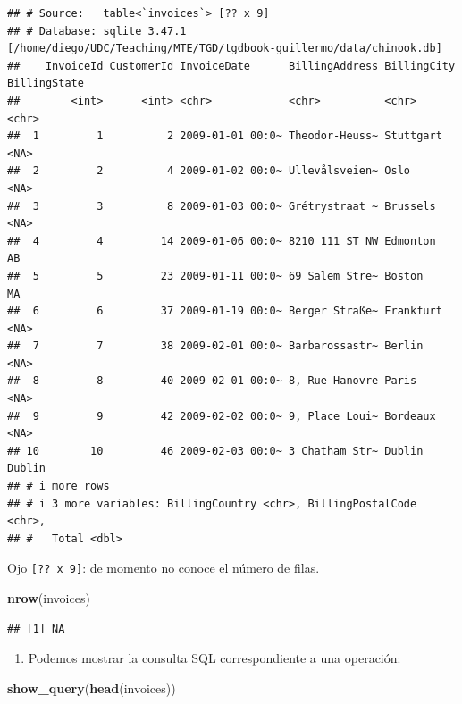 \documentclass[
]{book}
\newenvironment{Shaded}{\begin{snugshade}}{\end{snugshade}}
\newcommand{\FunctionTok}[1]{\textcolor[rgb]{0.13,0.29,0.53}{\textbf{#1}}}
\newcommand{\NormalTok}[1]{#1}
\providecommand{\tightlist}{%
  \setlength{\itemsep}{0pt}\setlength{\parskip}{0pt}}
\begin{document}
\begin{verbatim}
## # Source:   table<`invoices`> [?? x 9]
## # Database: sqlite 3.47.1 [/home/diego/UDC/Teaching/MTE/TGD/tgdbook-guillermo/data/chinook.db]
##    InvoiceId CustomerId InvoiceDate      BillingAddress BillingCity BillingState
##        <int>      <int> <chr>            <chr>          <chr>       <chr>       
##  1         1          2 2009-01-01 00:0~ Theodor-Heuss~ Stuttgart   <NA>        
##  2         2          4 2009-01-02 00:0~ Ullevålsveien~ Oslo        <NA>        
##  3         3          8 2009-01-03 00:0~ Grétrystraat ~ Brussels    <NA>        
##  4         4         14 2009-01-06 00:0~ 8210 111 ST NW Edmonton    AB          
##  5         5         23 2009-01-11 00:0~ 69 Salem Stre~ Boston      MA          
##  6         6         37 2009-01-19 00:0~ Berger Straße~ Frankfurt   <NA>        
##  7         7         38 2009-02-01 00:0~ Barbarossastr~ Berlin      <NA>        
##  8         8         40 2009-02-01 00:0~ 8, Rue Hanovre Paris       <NA>        
##  9         9         42 2009-02-02 00:0~ 9, Place Loui~ Bordeaux    <NA>        
## 10        10         46 2009-02-03 00:0~ 3 Chatham Str~ Dublin      Dublin      
## # i more rows
## # i 3 more variables: BillingCountry <chr>, BillingPostalCode <chr>,
## #   Total <dbl>
\end{verbatim}

Ojo \texttt{{[}??\ x\ 9{]}}: de momento no conoce el número de filas.

\begin{Shaded}
\begin{Highlighting}[]
\FunctionTok{nrow}\NormalTok{(invoices)}
\end{Highlighting}
\end{Shaded}

\begin{verbatim}
## [1] NA
\end{verbatim}

\begin{enumerate}
\def\labelenumi{\arabic{enumi}.}
\tightlist
\item
  Podemos mostrar la consulta SQL correspondiente a una operación:
\end{enumerate}

\begin{Shaded}
\begin{Highlighting}[]
\FunctionTok{show\_query}\NormalTok{(}\FunctionTok{head}\NormalTok{(invoices))}
\end{Highlighting}
\end{Shaded}
\end{document}
